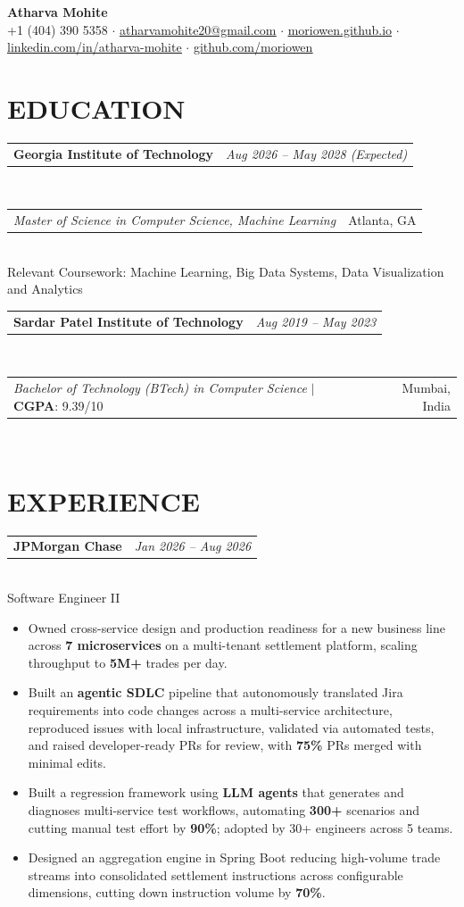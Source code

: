 \documentclass[10pt,letterpaper]{article}
\makeatletter
\newcommand{\link}[2]{\href{#1}{\textcolor{linkblue}{\underline{#2}}}}
\newcommand{\entry}[2]{%
  \begin{tabularx}{\textwidth}{@{}X r@{}}\textbf{#1} & \textit{#2}\end{tabularx}\\[-1pt]}
\newcommand{\subentry}[2]{%
  \begin{tabularx}{\textwidth}{@{}X r@{}}#1 & #2\end{tabularx}\\[-1pt]}
\makeatother
\begin{document}
\fontsize{9.6pt}{11.9pt}\selectfont

\begin{center}
  {\fontsize{20pt}{22pt}\selectfont\bfseries Atharva Mohite}\\[2pt]
  {\small +1 (404) 390 5358 $\cdot$
  \link{mailto:atharvamohite20@gmail.com}{atharvamohite20@gmail.com} $\cdot$
  \link{https://moriowen.github.io/}{moriowen.github.io} $\cdot$
  \link{https://www.linkedin.com/in/atharva-mohite/}{linkedin.com/in/atharva-mohite} $\cdot$
  \link{https://github.com/moriowen}{github.com/moriowen}}
\end{center}
\vspace{-9.3pt}

\section{EDUCATION}
\vspace{-1.7pt}
\entry{Georgia Institute of Technology}{Aug 2026 -- May 2028 (Expected)}
\subentry{\textit{Master of Science in Computer Science, Machine Learning}}{Atlanta, GA}
Relevant Coursework: Machine Learning, Big Data Systems, Data Visualization and Analytics\\[1.8pt]
\entry{Sardar Patel Institute of Technology}{Aug 2019 -- May 2023}
\subentry{\textit{Bachelor of Technology (BTech) in Computer Science} $|$ \textbf{CGPA}: 9.39/10}{Mumbai, India}

\section{EXPERIENCE}
\vspace{-1.7pt}
\entry{JPMorgan Chase}{Jan 2026 -- Aug 2026}
Software Engineer II
\begin{itemize}
  \item Owned cross-service design and production readiness for a new business line across \textbf{7 microservices} on a multi-tenant settlement platform, scaling throughput to \textbf{5M+} trades per day.
  \item Built an \textbf{agentic SDLC} pipeline that autonomously translated Jira requirements into code changes across a multi-service architecture, reproduced issues with local infrastructure, validated via automated tests, and raised developer-ready PRs for review, with \textbf{75\%} PRs merged with minimal edits.
  \item Built a regression framework using \textbf{LLM agents} that generates and diagnoses multi-service test workflows, automating \textbf{300+} scenarios and cutting manual test effort by \textbf{90\%}; adopted by 30+ engineers across 5 teams.
  \item Designed an aggregation engine in Spring Boot reducing high-volume trade streams into consolidated settlement instructions across configurable dimensions, cutting down instruction volume by \textbf{70\%}.
\end{itemize}
\end{document}

